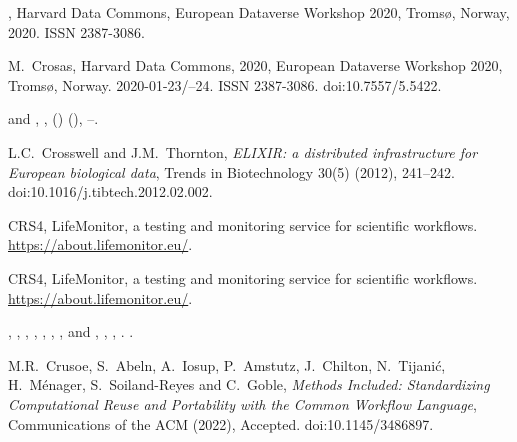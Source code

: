 \documentclass[ds,v1.1.2,openaccess]{iosart2x}%
\begin{document}
\begin{thebibliography}{}
%
\begin{botherref}
,
Harvard Data Commons,
European Dataverse Workshop 2020,
Troms{\o}, Norway,
2020. ISSN 2387-3086.
\end{botherref}
%
\OrigBibText
M.~Crosas,
Harvard Data Commons,
2020,
European Dataverse Workshop 2020, Troms{\o}, Norway. 2020-01-23/--24.
ISSN 2387-3086.
doi:10.7557/5.5422.
\endOrigBibText
{}
\endbibitem

%
\begin{barticle}
 and
,
,
()
(),
--.
\end{barticle}
%
\OrigBibText
L.C.~Crosswell and
J.M.~Thornton,
\textit{{ELIXIR}: a distributed infrastructure for European biological data},
Trends in Biotechnology
30(5)
(2012),
241--242.
doi:10.1016/j.tibtech.2012.02.002.
\endOrigBibText
{}
\endbibitem

%
\begin{botherref}
{CRS4},
{LifeMonitor}, a testing and monitoring service for scientific workflows.
\url{https://about.lifemonitor.eu/}.
\end{botherref}
%
\OrigBibText
CRS4,
{LifeMonitor}, a testing and monitoring service for scientific workflows.
\url{https://about.lifemonitor.eu/}.
\endOrigBibText
{}
\endbibitem

%
\begin{bbook}
,
,
,
,
,
,
,
 and
,
,
,
.
.
\end{bbook}
%
\OrigBibText
M.R.~Crusoe,
S.~Abeln,
A.~Iosup,
P.~Amstutz,
J.~Chilton,
N.~Tijani\'{c},
H.~M\'{e}nager,
S.~Soiland-Reyes and
C.~Goble,
\textit{Methods Included: Standardizing Computational Reuse and Portability
with the Common Workflow Language},
Communications of the ACM
(2022),
Accepted.
doi:10.1145/3486897.
\endOrigBibText
{}
\endbibitem


\end{thebibliography}
\end{document}
